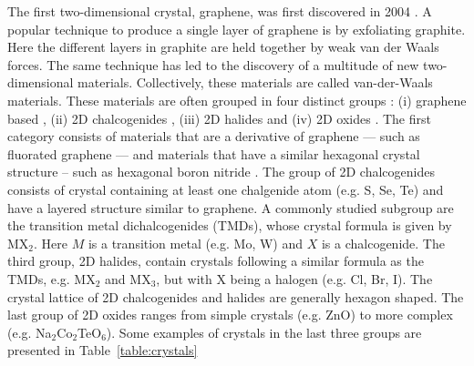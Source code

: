 The first two-dimensional crystal, graphene, was first discovered in 2004 \cite{novoselov_electric_2004}. A popular technique to produce a single layer of graphene is by exfoliating graphite. Here the different layers in graphite are held together by weak van der Waals forces. The same technique has led to the discovery of a multitude of new two-dimensional materials. Collectively, these materials are called van-der-Waals materials. These materials are often grouped in four distinct groups \cite{sethulakshmi_magnetism_2019,tsymbal_spintronics_2019, liu_chapter_2020}: (i) graphene based \cite{?}, (ii) 2D chalcogenides \cite{novoselov_two-dimensional_2005, yang_long-lived_2015, chhowalla_chemistry_2013, wang_electronics_2012-1, ugeda_characterization_2016, zhang_direct_2013, ma_evidence_2012, butler_progress_2013, zeng_valley_2012, xiao_coupled_2012, mak_atomically_2010, radisavljevic_single-layer_2011}, (iii) 2D halides \cite{?} and (iv) 2D oxides \cite{?}. The first category consists of materials that are a derivative of graphene --- such as fluorated graphene \cite{feng_two-dimensional_2016} --- and materials that have a similar hexagonal crystal structure -- such as hexagonal boron nitride \cite{zhang_two_2017}. The group of 2D chalcogenides consists of crystal containing at least one chalgenide atom (e.g. S, Se, Te) and have a layered structure similar to graphene. A commonly studied subgroup are the transition metal dichalcogenides (TMDs), whose crystal formula is given by MX$_2$. Here $M$ is a transition metal (e.g. Mo, W) and $X$ is a chalcogenide. The third group, 2D halides, contain crystals following a similar formula as the TMDs, e.g. MX$_2$ and MX$_3$, but with X being a halogen (e.g. Cl, Br, I). The crystal lattice of 2D chalcogenides and halides are generally hexagon shaped. The last group of 2D oxides ranges from simple crystals (e.g. ZnO) to more complex (e.g. Na$_2$Co$_2$TeO$_6$). Some examples of crystals in the last three groups are presented in Table~\ref{table:crystals}
